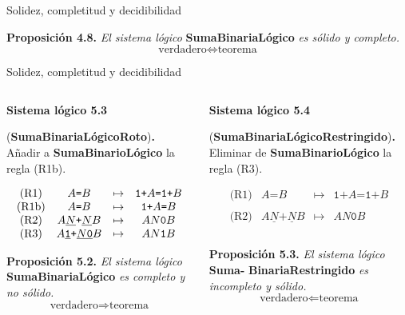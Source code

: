 \documentclass[10pt,xcolor=dvipsnames,aspectratio=169,spanish]{beamer}
\begin{document}
\begin{frame}{Solidez, completitud y decidibilidad}

\textbf{Proposición 4.8.} \emph{El sistema lógico} \textbf{SumaBinariaLógico} \emph{es sólido y completo.}
\pause
{\large $$\text{verdadero}\iff\text{teorema}$$}

\end{frame}

\begin{frame}{Solidez, completitud y decidibilidad}

\begin{columns}
\begin{column}{0.5\textwidth}
\textbf{Sistema lógico 5.3}

(\textbf{SumaBinariaLógicoRoto})\textbf{.}\\[3mm]

Añadir a \textbf{SumaBinarioLógico} la regla (R1b).

$$
    \begin{matrix}
    \text{(R1)} & A\texttt{=}B & \mapsto & \texttt{1+}A\texttt{=}\texttt{1+}B \\
    \text{(R1b)} & A\texttt{=}B & \mapsto & \texttt{1+}A\texttt{=}B \\
    \text{(R2)} & A\underline{N}\texttt{+}\underline{N}B & \mapsto & AN\texttt{0}B \\
    \text{(R3)} & A\texttt{\underline{1}+}\underline{N\texttt{0}}B & \mapsto & AN\texttt{1}B
    \end{matrix}
$$

\vspace{3mm}

\textbf{Proposición 5.2.} \emph{El sistema lógico} \textbf{SumaBinariaLógico} \emph{es completo y no sólido.}
{\large $$\text{verdadero}\Rightarrow\text{teorema}$$}

\end{column}
\begin{column}{0.5\textwidth}  %
\textbf{Sistema lógico 5.4}

(\textbf{SumaBinariaLógicoRestringido})\textbf{.}\\[3mm]

Eliminar de \textbf{SumaBinarioLógico} la regla (R3).

$$
    \begin{matrix}
    \text{(R1)} & A\texttt{=}B & \mapsto & \texttt{1+}A\texttt{=}\texttt{1+}B \\
     \\
    \text{(R2)} & A\underline{N}\texttt{+}\underline{N}B & \mapsto & AN\texttt{0}B \\
    \\
    \end{matrix}
$$

\vspace{3mm}

\textbf{Proposición 5.3.} \emph{El sistema lógico} \textbf{Suma-} \textbf{BinariaRestringido} \emph{es incompleto y sólido.}
{\large $$\text{verdadero}\Leftarrow\text{teorema}$$}
\end{column}
\end{columns}

\end{frame}
\end{document}
